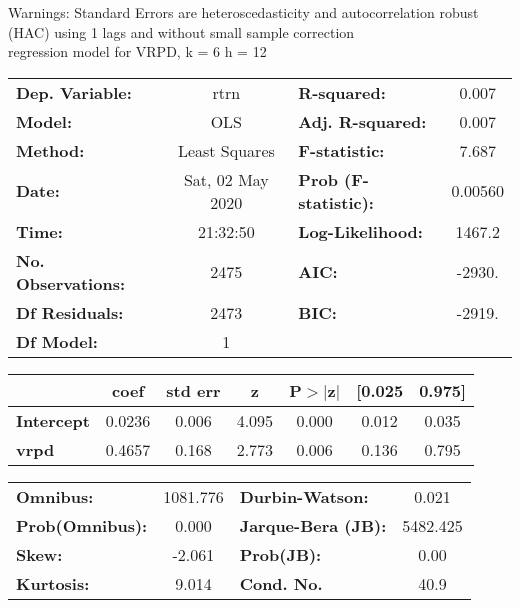 Warnings: \newline
 [1] Standard Errors are heteroscedasticity and autocorrelation robust (HAC) using 1 lags and without small sample correction\\ 

regression model for VRPD, k = 6 h = 12\begin{center}
\begin{tabular}{lclc}
\toprule
\textbf{Dep. Variable:}    &       rtrn       & \textbf{  R-squared:         } &     0.007   \\
\textbf{Model:}            &       OLS        & \textbf{  Adj. R-squared:    } &     0.007   \\
\textbf{Method:}           &  Least Squares   & \textbf{  F-statistic:       } &     7.687   \\
\textbf{Date:}             & Sat, 02 May 2020 & \textbf{  Prob (F-statistic):} &  0.00560    \\
\textbf{Time:}             &     21:32:50     & \textbf{  Log-Likelihood:    } &    1467.2   \\
\textbf{No. Observations:} &        2475      & \textbf{  AIC:               } &    -2930.   \\
\textbf{Df Residuals:}     &        2473      & \textbf{  BIC:               } &    -2919.   \\
\textbf{Df Model:}         &           1      & \textbf{                     } &             \\
\bottomrule
\end{tabular}
\begin{tabular}{lcccccc}
                   & \textbf{coef} & \textbf{std err} & \textbf{z} & \textbf{P$> |$z$|$} & \textbf{[0.025} & \textbf{0.975]}  \\
\midrule
\textbf{Intercept} &       0.0236  &        0.006     &     4.095  &         0.000        &        0.012    &        0.035     \\
\textbf{vrpd}      &       0.4657  &        0.168     &     2.773  &         0.006        &        0.136    &        0.795     \\
\bottomrule
\end{tabular}
\begin{tabular}{lclc}
\textbf{Omnibus:}       & 1081.776 & \textbf{  Durbin-Watson:     } &    0.021  \\
\textbf{Prob(Omnibus):} &   0.000  & \textbf{  Jarque-Bera (JB):  } & 5482.425  \\
\textbf{Skew:}          &  -2.061  & \textbf{  Prob(JB):          } &     0.00  \\
\textbf{Kurtosis:}      &   9.014  & \textbf{  Cond. No.          } &     40.9  \\
\bottomrule
\end{tabular}
\end{center}

